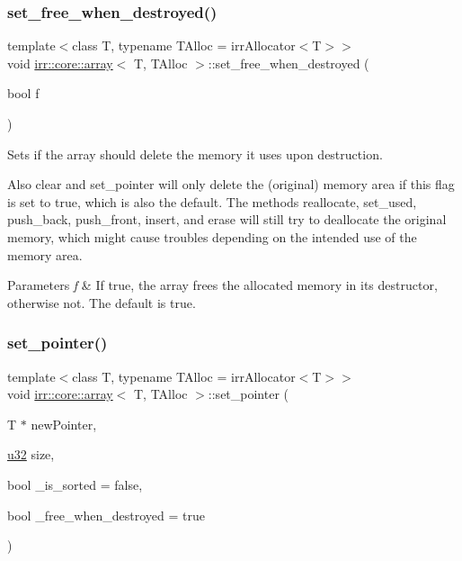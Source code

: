 \subsubsection{\texorpdfstring{set\+\_\+free\+\_\+when\+\_\+destroyed()}{set\_free\_when\_destroyed()}\hspace{0.1cm}{\footnotesize\ttfamily [2/2]}}
{\footnotesize\ttfamily template$<$class T, typename T\+Alloc = irr\+Allocator$<$\+T$>$$>$ \\
void \hyperlink{classirr_1_1core_1_1array}{irr\+::core\+::array}$<$ T, T\+Alloc $>$\+::set\+\_\+free\+\_\+when\+\_\+destroyed (\begin{DoxyParamCaption}\item[{bool}]{f }\end{DoxyParamCaption})\hspace{0.3cm}{\ttfamily [inline]}}



Sets if the array should delete the memory it uses upon destruction. 

Also clear and set\+\_\+pointer will only delete the (original) memory area if this flag is set to true, which is also the default. The methods reallocate, set\+\_\+used, push\+\_\+back, push\+\_\+front, insert, and erase will still try to deallocate the original memory, which might cause troubles depending on the intended use of the memory area. 
\begin{DoxyParams}{Parameters}
{\em f} & If true, the array frees the allocated memory in its destructor, otherwise not. The default is true. \\
\hline
\end{DoxyParams}
\mbox{\label{classirr_1_1core_1_1array_a75df5c46b08225d1ebe3c1381d85d9ff}} 
\subsubsection{\texorpdfstring{set\+\_\+pointer()}{set\_pointer()}\hspace{0.1cm}{\footnotesize\ttfamily [1/2]}}
{\footnotesize\ttfamily template$<$class T, typename T\+Alloc = irr\+Allocator$<$\+T$>$$>$ \\
void \hyperlink{classirr_1_1core_1_1array}{irr\+::core\+::array}$<$ T, T\+Alloc $>$\+::set\+\_\+pointer (\begin{DoxyParamCaption}\item[{T $\ast$}]{new\+Pointer,  }\item[{\hyperlink{namespaceirr_a0416a53257075833e7002efd0a18e804}{u32}}]{size,  }\item[{bool}]{\+\_\+is\+\_\+sorted = {\ttfamily false},  }\item[{bool}]{\+\_\+free\+\_\+when\+\_\+destroyed = {\ttfamily true} }\end{DoxyParamCaption})\hspace{0.3cm}{\ttfamily [inline]}}



